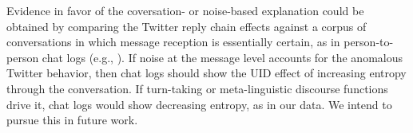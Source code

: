 \documentclass[11pt,letterpaper]{article}
\begin{document}
%
%
%

Evidence in favor of the coversation- or noise-based explanation could be obtained by comparing the Twitter reply chain effects against a corpus of conversations in which message reception is essentially certain, as in person-to-person chat logs (e.g., ).  If noise at the message level accounts for the anomalous Twitter behavior, then chat logs should show the UID effect of increasing entropy through the conversation. If turn-taking or meta-linguistic discourse functions drive it, chat logs would show decreasing entropy, as in our data. We intend to pursue this in future work.
\end{document}
